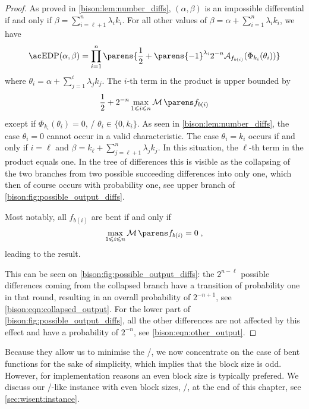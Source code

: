 \begin{proof}
    As proved in \cref{bison:lem:number_diffs}, $(\alpha, \beta)$ is an impossible differential if and only if $\beta = \sum_{i=\ell + 1}^n \lambda_i k_i$.
    For all other values of $\beta = \alpha + \sum_{i=1}^n \lambda_i k_i$, we have
    \begin{equation*}
        \mathrm{\EDP/}(\alpha, \beta) = \prod_{i=1}^n \parens{\frac{1}{2} + \parens{-1}^{\lambda_i} 2^{-n} \AC{f_{b(i)}}(\Phi_{k_i}(\theta_i))}
    \end{equation*}
    where $\theta_i = \alpha + \sum_{j=1}^i \lambda_j k_j$.
    The $i$-th term in the product is upper bounded by
    \begin{equation*}
        \frac{1}{2} + 2^{-n} \max_{1 \leqslant i \leqslant n} \absoluteindicator{f_{b(i)}}
    \end{equation*}
    except if $\Phi_{k_i}(\theta_i) =0$, \ie/ $\theta_i \in \{0, k_i\}$.
    As seen in \cref{bison:lem:number_diffs}, the case $\theta_i=0$ cannot occur in a valid characteristic.
    The case $\theta_i=k_i$ occurs if and only if $i=\ell$ and $\beta = k_\ell + \sum_{j=\ell + 1}^n \lambda_j k_j$.
    In this situation, the $\ell$-th term in the product equals one.
    In the tree of differences this is visible as the collapsing of the two branches from two possible succeeding differences into only one, which then of course occurs with probability one, see upper branch of \cref{bison:fig:possible_output_diffs}.

    Most notably, all $f_{b(i)}$ are bent if and only if
    \begin{equation*}
        \max_{1 \leqslant i \leqslant n} \absoluteindicator{f_{b(i)}} = 0\;,
    \end{equation*}
    leading to the result.

    This can be seen on \cref{bison:fig:possible_output_diffs}: the $2^{n-\ell}$ possible differences coming from the collapsed branch have a transition of probability one in that round, resulting in an overall probability of $2^{-n+1}$, see \cref{bison:eqn:collapsed_output}.
    For the lower part of \cref{bison:fig:possible_output_diffs}, all the other differences are not affected by this effect and have a probability of $2^{-n}$, see \cref{bison:eqn:other_output}.
\end{proof}

Because they allow us to minimise the \MEDP/, we now concentrate on the case of bent functions for the sake of simplicity, which implies that the block size is odd.
However, for implementation reasons an even block size is typically prefered.
We discuss our \bison/-like instance with even block sizes, \wisent/, at the end of this chapter, see \cref{sec:wisent:instance}.


